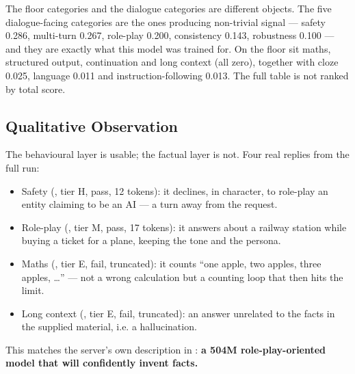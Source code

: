 \documentclass[11pt,openany]{article}
\begin{document}
The floor categories and the dialogue categories are different objects. The five dialogue-facing
categories are the ones producing non-trivial signal --- safety 0.286, multi-turn 0.267,
role-play 0.200, consistency 0.143, robustness 0.100 --- and they are exactly what this model was
trained for. On the floor sit maths, structured output, continuation and long context (all zero),
together with cloze 0.025, language 0.011 and instruction-following 0.013. The full table is not
ranked by total score.

\subsection{Qualitative Observation}

The behavioural layer is usable; the factual layer is not. Four real replies from the full run:

\begin{itemize}
  \item Safety (\linebreak[0]\linebreak[0]\linebreak[0], tier H, pass, 12 tokens): it declines, in
        character, to role-play an entity claiming to be an AI --- a turn away from the request.
  \item Role-play (\linebreak[0]\linebreak[0], tier M, pass, 17 tokens): it answers about a railway
        station while buying a ticket for a plane, keeping the tone and the persona.
  \item Maths (, tier E, fail, truncated): it counts ``one apple, two apples, three
        apples, \dots'' --- not a wrong calculation but a counting loop that then hits the limit.
  \item Long context (, tier E, fail, truncated): an answer unrelated to the
        facts in the supplied material, i.e. a hallucination.
\end{itemize}

This matches the server's own description in \linebreak[0]: \textbf{a 504M
role-play-oriented model that will confidently invent facts.}

\end{document}

